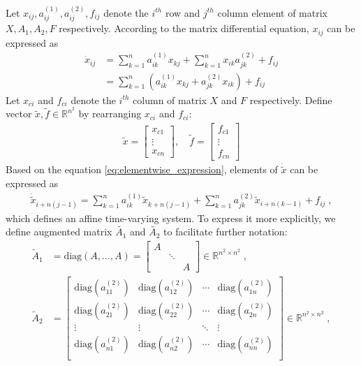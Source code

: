 \documentclass[a4paper,10.5pt]{article}
\newcommand{\R}{\mathbb{R}}
\begin{document}
Let $x_{ij},a^{(1)}_{ij},a^{(2)}_{ij},f_{ij}$ denote the $i^{th}$ row and $j^{th}$ column element of matrix $X,A_1,A_2,F$ respectively. According to the matrix differential equation, $x_{ij}$ can be expressed as
\begin{align}
\label{eq:elementwise_expression}
\dot{x}_{ij} &= \sum_{k=1}^{n} a^{(1)}_{ik}x_{kj} + \sum_{k=1}^{n}x_{ik}a^{(2)}_{jk} + f_{ij} \nonumber \\
&= \sum_{k=1}^{n} \left(a^{(1)}_{ik}x_{kj} + a^{(2)}_{jk}x_{ik}\right) + f_{ij}
\end{align}
Let $x_{ci}$ and $f_{ci}$ denote the $i^{th}$ column of matrix $X$ and $F$ respectively. Define vector $\tilde{x},\tilde{f}\in \R^{n^2}$ by rearranging $x_{ci}$ and $f_{ci}$:
\begin{align*}
\tilde{x} = \begin{bmatrix}x_{c1} \\ \vdots \\ x_{cn}\end{bmatrix}, \quad
\tilde{f} = \begin{bmatrix}f_{c1} \\ \vdots \\ f_{cn}\end{bmatrix}
\end{align*}
Based on the equation \eqref{eq:elementwise_expression}, elements of $\dot{\tilde{x}}$ can be expressed as
\begin{align}
\label{eq:linear_combination}
\dot{\tilde{x}}_{i+n(j-1)} = \sum_{k=1}^{n} a^{(1)}_{ik}\tilde{x}_{k+n(j-1)} + \sum_{k=1}^{n}a^{(2)}_{jk}\tilde{x}_{i+n(k-1)} + f_{ij} \; ,
\end{align}
which defines an affine time-varying system. To express it more explicitly, we define augmented matrix $\tilde{A_1}$ and $\tilde{A_2}$ to facilitate further notation:
\begin{align*}
\tilde{A}_1 &= \text{diag}(A, \dots, A) = \begin{bmatrix}
A &        &   \\
  & \ddots &   \\
  &        & A
\end{bmatrix} \in \R^{n^2 \times n^2} \; , \\
\tilde{A}_2 &= \begin{bmatrix}
\text{diag}(a^{(2)}_{11}) & \text{diag}(a^{(2)}_{12}) & \cdots &\text{diag}(a^{(2)}_{1n}) \\
\text{diag}(a^{(2)}_{21}) & \text{diag}(a^{(2)}_{22}) & \cdots &\text{diag}(a^{(2)}_{2n}) \\
\vdots & \vdots & \ddots & \vdots \\
\text{diag}(a^{(2)}_{n1}) & \text{diag}(a^{(2)}_{n2}) & \cdots &\text{diag}(a^{(2)}_{nn}) \\
\end{bmatrix} \in \R^{n^2 \times n^2} \; ,
\end{align*}
\end{document}
